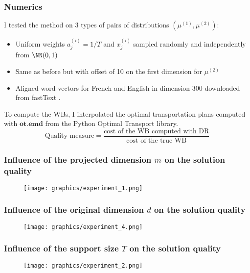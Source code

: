 \documentclass{beamer}
\begin{document}
\begin{frame}
\frametitle{Numerics}
I tested the method on 3 types of pairs of distributions $(\mu^{(1)}, \mu^{(2)})$:
\begin{itemize}
    \item Uniform weights $a^{(i)}_j = 1 / T$ and $x^{(i)}_j$ sampled randomly and independently from $\NN(0, 1)$
    \item Same as before but with offset of 10 on the first dimension for $\mu^{(2)}$
    \item Aligned word vectors for French and English in dimension 300 downloaded from fastText \cite{noauthor_aligned_nodate}.
\end{itemize}

To compute the WBs, I interpolated the optimal transportation plans computed with $\mathbf{ot.emd}$ from the Python Optimal Transport library.
$$\text{Quality measure} = \frac {\text{cost of the WB computed with DR}} {\text{cost of the true WB}}$$

\end{frame}

\begin{frame}
\frametitle{Influence of the projected dimension $m$ on the solution quality}
\begin{figure}
  \centering
  \texttt{[image: graphics/experiment\_1.png]}
\end{figure}
\end{frame}

\begin{frame}
\frametitle{Influence of the original dimension $d$ on the solution quality}
\begin{figure}
  \centering
  \texttt{[image: graphics/experiment\_4.png]}
\end{figure}
\end{frame}

\begin{frame}
\frametitle{Influence of the support size $T$ on the solution quality}
\begin{figure}
  \centering
  \texttt{[image: graphics/experiment\_2.png]}
\end{figure}
\end{frame}
\end{document}
